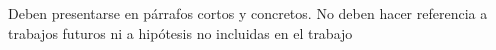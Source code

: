 Deben presentarse en párrafos cortos y concretos. No deben hacer referencia a trabajos futuros ni a hipótesis no incluidas en el trabajo